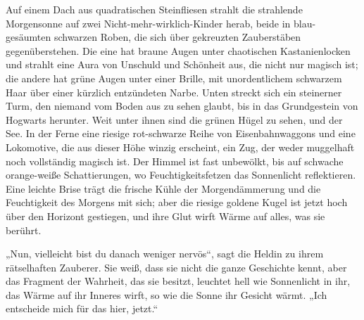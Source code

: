 \later

Auf einem Dach aus quadratischen Steinfliesen strahlt die strahlende Morgensonne auf zwei Nicht-mehr-wirklich-Kinder herab, beide in blau-gesäumten schwarzen Roben, die sich über gekreuzten Zauberstäben gegenüberstehen.
Die eine hat braune Augen unter chaotischen Kastanienlocken und strahlt eine Aura von Unschuld und Schönheit aus, die nicht nur magisch ist; die andere hat grüne Augen unter einer Brille, mit unordentlichem schwarzem Haar über einer kürzlich entzündeten Narbe. Unten streckt sich ein steinerner Turm, den niemand vom Boden aus zu sehen glaubt, bis in das Grundgestein von Hogwarts herunter. Weit unter ihnen sind die grünen Hügel zu sehen, und der See. In der Ferne eine riesige rot-schwarze Reihe von Eisenbahnwaggons und eine Lokomotive, die aus dieser Höhe winzig erscheint, ein Zug, der weder muggelhaft noch vollständig magisch ist. Der Himmel ist fast unbewölkt, bis auf schwache orange-weiße Schattierungen, wo Feuchtigkeitsfetzen das Sonnenlicht reflektieren. Eine leichte Brise trägt die frische Kühle der Morgendämmerung und die Feuchtigkeit des Morgens mit sich; aber die riesige goldene Kugel ist jetzt hoch über den Horizont gestiegen, und ihre Glut wirft Wärme auf alles, was sie berührt.

„Nun, vielleicht bist du danach weniger nervös“, sagt die Heldin zu ihrem rätselhaften Zauberer. Sie weiß, dass sie nicht die ganze Geschichte kennt, aber das Fragment der Wahrheit, das sie besitzt, leuchtet hell wie Sonnenlicht in ihr, das Wärme auf ihr Inneres wirft, so wie die Sonne ihr Gesicht wärmt.
„Ich entscheide mich für das hier, jetzt.“

